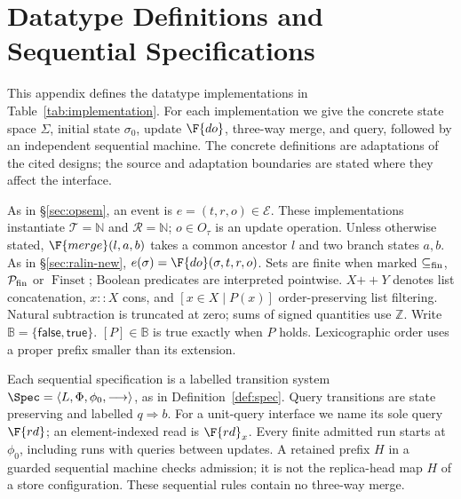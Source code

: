 \section{Datatype Definitions and Sequential Specifications}
\label{app:datatypes}

This appendix defines the datatype implementations in Table~\ref{tab:implementation}.
For each implementation we give the concrete state space $\Sigma$, initial state
$\sigma_0$, update $\F{do}$, three-way merge, and query, followed by an
independent sequential machine. The concrete definitions are adaptations of
the cited designs; the source and adaptation boundaries are
stated where they affect the interface.

As in \S\ref{sec:opsem}, an event is $e=(t,r,o)\in\mathcal E$.
These implementations instantiate $\mathcal T=\mathbb N$ and
$\mathcal R=\mathbb N$; $o\in O_\tau$ is an update operation. Unless otherwise stated,
$\F{merge}(l,a,b)$ takes a common ancestor $l$ and two branch states $a,b$.
As in \S\ref{sec:ralin-new}, $e(\sigma)=\F{do}(\sigma,t,r,o)$.
Sets are finite when marked $\subseteq_{\rm fin}$, $\mathcal P_{\rm fin}$
or $\operatorname{Finset}$; Boolean predicates are interpreted pointwise.
$X\mathbin{+\!+}Y$ denotes list concatenation, $x::X$ cons,
and $[x\in X\mid P(x)]$ order-preserving list filtering.
Natural subtraction is truncated at zero; sums of signed quantities use
$\mathbb Z$. Write $\mathbb B=\{\mathsf{false},\mathsf{true}\}$.
$[P]\in\mathbb B$ is true
exactly when $P$ holds. Lexicographic order uses a proper prefix smaller
than its extension.

Each sequential specification is a labelled transition system
$\Spec=\langle L,\Phi,\phi_0,\longrightarrow\rangle$, as in
Definition~\ref{def:spec}. Query transitions are state preserving and
labelled $q\Rightarrow b$. For a unit-query interface we name its sole
query $\F{rd}$; an element-indexed read is $\F{rd}_x$.
Every finite admitted run starts at $\phi_0$, including runs with queries
between updates. A retained prefix $H$ in a guarded sequential machine
checks admission; it is not the replica-head map $H$ of a store
configuration. These sequential rules contain no three-way merge.

